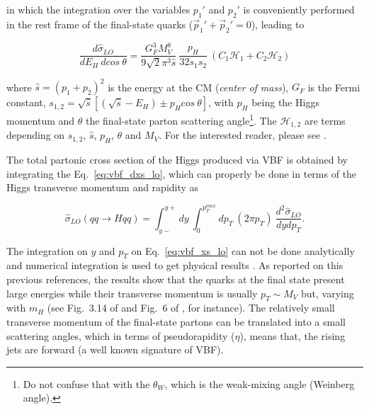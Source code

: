 in which the integration over the variables $p_{1}'$ and $p_{2}'$ is conveniently performed in the rest frame of the final-state quarks ($\vec{p}_{1}' + \vec{p}_{2}' = 0$), leading to \cite{bib:PhysRep457-1-2005}

\begin{equation}
\frac{d\hat{\sigma}_{LO}}{dE_{H}~dcos~\theta} = \frac{G_{F}^{3}M_{V}^{8}}{9\sqrt{2}\pi^{3}\hat{s}}~\frac{p_{H}}{32s_{1}s_{2}}~(C_{1}\mathcal{H}_{1} + C_{2}\mathcal{H}_{2})
\label{eq:vbf_dxs_lo}
\end{equation}

where $\hat{s} = (p_{1}+p_{2})^{2}$ is the energy at the CM (\textit{center of mass}), $G_{F}$ is the Fermi constant, $s_{1,2} = \sqrt{\hat{s}}[(\sqrt{\hat{s}}-E_{H}) \pm p_{H}cos~\theta]$, with $p_{H}$ being the Higgs momentum and $\theta$ the final-state parton scattering angle\footnote{Do not confuse that with the $\theta_{W}$, which is the weak-mixing angle (Weinberg angle).}. The $\mathcal{H}_{1,2}$ are terms depending on $s_{1,2}$, $\hat{s}$, $p_{H}$, $\theta$ and $M_{V}$. For the interested reader, please see \cite{bib:PhysRep457-1-2005}.

The total partonic cross section of the Higgs produced via VBF is obtained by integrating the Eq.~\ref{eq:vbf_dxs_lo}, which can properly be done in terms of the Higgs transverse momentum and rapidity as

\begin{equation}
\hat{\sigma}_{LO}(qq \rightarrow Hqq) = \int_{y-}^{y+}dy~\int_{0}^{p_{T}^{max}}dp_{T}~(2\pi p_{T})~\frac{d^{2}\hat{\sigma}_{LO}}{dydp_{T}}.
\label{eq:vbf_xs_lo}
\end{equation}

The integration on $y$ and $p_{T}$ on Eq.~\ref{eq:vbf_xs_lo} can not be done analytically and numerical integration is used to get physical results \cite{bib:PhysRep457-1-2005,bib:NuclPhysB287-1987}. As reported on this previous references, the results show that the quarks at the final state present large energies while their transverse momentum is usually $p_{T} \sim M_{V}$ but, varying with $m_{H}$ (see Fig.~3.14 of \cite{bib:PhysRep457-1-2005} and Fig.~6 of \cite{bib:NuclPhysB287-1987}, for instance). The relatively small transverse momentum of the final-state partons can be translated into a small scattering angles, which in terms of pseudorapidity ($\eta$), means that, the rising jets are forward (a well known signature of VBF).


